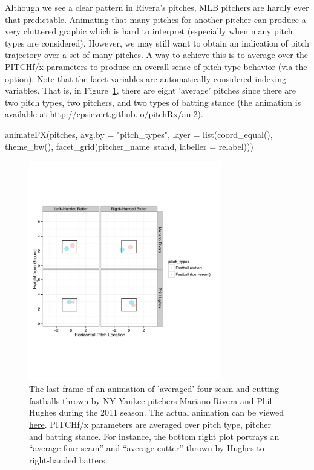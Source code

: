 \begin{article}
Although we see a clear pattern in Rivera's pitches, MLB pitchers
are hardly ever that predictable. Animating that many pitches for
another pitcher can produce a very cluttered graphic which is hard
to interpret (especially when many pitch types are considered). However,
we may still want to obtain an indication of pitch trajectory over
a set of many pitches. A way to achieve this is to average over the
PITCHf/x parameters to produce an overall sense of pitch type behavior
(via the  option). Note that the facet variables are
automatically considered indexing variables. That is, in Figure~\ref{fig:animate2},
there are eight 'average' pitches since there are two pitch types,
two pitchers, and two types of batting stance (the animation is available
at \url{http://cpsievert.github.io/pitchRx/ani2}).
%
\begin{Schunk}
\begin{Sinput}
animateFX(pitches, avg.by = "pitch_types", layer = list(coord_equal(), theme_bw(),
  facet_grid(pitcher_name~stand, labeller = relabel)))
\end{Sinput}
\end{Schunk}
%
\begin{figure}[h]
\centerline{\includegraphics[width=0.75\textwidth]{ani-frame2.pdf}}

\caption{\label{fig:animate2}The last frame of an animation of 'averaged'
four-seam and cutting fastballs thrown by NY Yankee pitchers Mariano
Rivera and Phil Hughes during the 2011 season. The actual animation
can be viewed \protect\href{http://cpsievert.github.io/pitchRx/ani2}{here}.
PITCHf/x parameters are averaged over pitch type, pitcher and batting
stance. For instance, the bottom right plot portrays an ``average
four-seam'' and ``average cutter'' thrown by Hughes to right-handed
batters. }
\end{figure}




\end{article}
